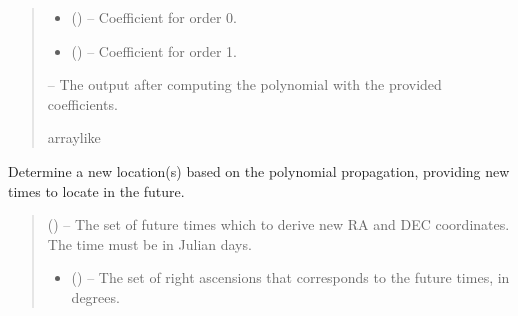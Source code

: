 \documentclass[letterpaper,11pt,english]{sphinxmanual}
\begin{document}
\begin{savenotes}
\begin{fulllineitems}
\begin{savenotes}
\begin{fulllineitems}
\begin{quote}
\begin{description}
\begin{itemize}
\item {} 
\sphinxAtStartPar
{} () – Coefficient for order 0.

\item {} 
\sphinxAtStartPar
{} () – Coefficient for order 1.

\end{itemize}

\sphinxAtStartPar
{} – The output after computing the polynomial with the provided
coefficients.

\sphinxAtStartPar
array\sphinxhyphen{}like

\end{description}\end{quote}

\end{fulllineitems}\end{savenotes}


\begin{savenotes}\begin{fulllineitems}
\label{\detokenize{code/opihiexarata.propagate.polynomial:opihiexarata.propagate.polynomial.LinearPropagationEngine.forward_propagate}}
\pysigstartsignatures
{}
\pysigstopsignatures
\sphinxAtStartPar
Determine a new location(s) based on the polynomial propagation,
providing new times to locate in the future.
\begin{quote}\begin{description}
\sphinxAtStartPar
{} () – The set of future times which to derive new RA and DEC coordinates.
The time must be in Julian days.

\sphinxAtStartPar
\begin{itemize}
\item {} 
\sphinxAtStartPar
{} () – The set of right ascensions that corresponds to the future times,
in degrees.


\end{itemize}
\end{description}
\end{quote}
\end{fulllineitems}
\end{savenotes}
\end{fulllineitems}
\end{savenotes}
\end{document}
